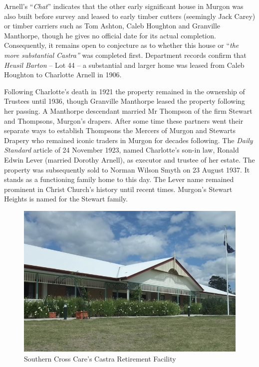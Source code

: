 Arnell's ``\emph{Chat}'' indicates that the other early significant house in Murgon was also built before survey and leased to early timber cutters (seemingly Jack Carey) or timber carriers such as Tom Ashton, Caleb Houghton and Granville Manthorpe, though he gives no official date for its actual completion. Consequently, it remains open to conjecture as to whether this house or ``\emph{the more substantial Castra''} was completed first. Department records confirm that \emph{Heusil Barton} -- Lot 44 -- a substantial and larger home was leased from Caleb Houghton to Charlotte Arnell in 1906.



Following Charlotte's death in 1921 the property remained in the ownership of Trustees until 1936, though Granville Manthorpe leased the property following her passing. A Manthorpe descendant married Mr Thompson of the firm Stewart and Thompsons, Murgon's drapers. After some time these partners went their separate ways to establish Thompsons the Mercers of Murgon and Stewarts Drapery who remained iconic traders in Murgon for decades following. The \emph{Daily Standard} article of 24 November 1923, named Charlotte's son-in law, Ronald Edwin Lever (married Dorothy Arnell), as executor and trustee of her estate. The property was subsequently sold to Norman Wilson Smyth on 23 August 1937. It stands as a functioning family home to this day. The Lever name remained prominent in Christ Church's history until recent times. Murgon's Stewart Heights is named for the Stewart family.









\begin{figure}
\begin{center}
\includegraphics[width=1.\linewidth,center]{../images/castraToday.png}
\caption{ Southern Cross Care's Castra Retirement Facility}
\end{center}
\end{figure}





